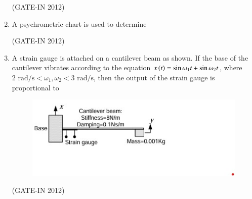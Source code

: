 \documentclass[journal,12pt,onecolumn]{IEEEtran}
\theoremstyle{remark}
\begin{document}
\begin{enumerate}
\hfill{(GATE-IN 2012)}
\begin{enumerate}
\end{enumerate}

\item A psychrometric chart is used to determine

\hfill{(GATE-IN 2012)}
\begin{enumerate}
\end{enumerate}

\item A strain gauge is attached on a cantilever beam as shown. If the base of the cantilever vibrates according to the equation $x\left(t\right) = \sin \omega_1 t + \sin \omega_2 t$, where $2 \text{ rad/s} < \omega_1, \omega_2 < 3 \text{ rad/s}$, then the output of the strain gauge is proportional to
\begin{figure}[H]
    \centering
    \includegraphics[width=0.7\columnwidth]{figs/a7.jpg}
    \caption*{}
    \label{fig:a7}
\end{figure}

\hfill{(GATE-IN 2012)}
\begin{enumerate}
\end{enumerate}


\end{enumerate}
\end{document}
